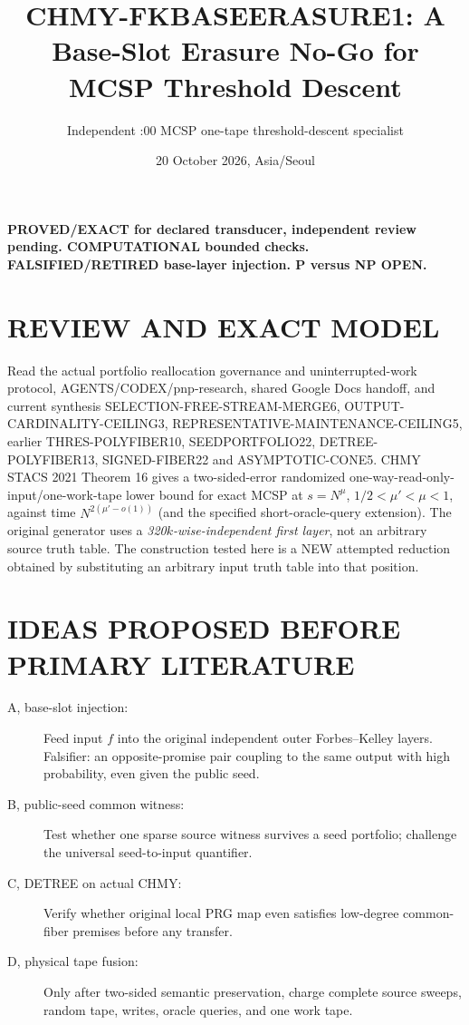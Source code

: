 \documentclass[11pt]{article}
\title{CHMY-FKBASEERASURE1: A Base-Slot Erasure No-Go for MCSP Threshold Descent}
\author{Independent :00 MCSP one-tape threshold-descent specialist}
\date{20 October 2026, Asia/Seoul}
\begin{document}
\maketitle
\noindent\textbf{PROVED/EXACT for declared transducer, independent review pending. COMPUTATIONAL bounded checks. FALSIFIED/RETIRED base-layer injection. P versus NP OPEN.}

\section*{REVIEW AND EXACT MODEL}
Read the actual portfolio reallocation governance and uninterrupted-work protocol, AGENTS/CODEX/pnp-research, shared Google Docs handoff, and current synthesis SELECTION-FREE-STREAM-MERGE6, OUTPUT-CARDINALITY-CEILING3, REPRESENTATIVE-MAINTENANCE-CEILING5, earlier THRES-POLYFIBER10, SEEDPORTFOLIO22, DETREE-POLYFIBER13, SIGNED-FIBER22 and ASYMPTOTIC-CONE5. CHMY STACS 2021 Theorem 16 gives a two-sided-error randomized one-way-read-only-input/one-work-tape lower bound for exact MCSP at $s=N^\mu$, $1/2<\mu'<\mu<1$, against time $N^{2(\mu'-o(1))}$ (and the specified short-oracle-query extension). The original generator uses a \emph{320$k$-wise-independent first layer}, not an arbitrary source truth table. The construction tested here is a NEW attempted reduction obtained by substituting an arbitrary input truth table into that position.

\section*{IDEAS PROPOSED BEFORE PRIMARY LITERATURE}
\begin{description}
\item[A, base-slot injection:] Feed input $f$ into the original independent outer Forbes--Kelley layers. Falsifier: an opposite-promise pair coupling to the same output with high probability, even given the public seed.
\item[B, public-seed common witness:] Test whether one sparse source witness survives a seed portfolio; challenge the universal seed-to-input quantifier.
\item[C, DETREE on actual CHMY:] Verify whether original local PRG map even satisfies low-degree common-fiber premises before any transfer.
\item[D, physical tape fusion:] Only after two-sided semantic preservation, charge complete source sweeps, random tape, writes, oracle queries, and one work tape.
\end{description}
\end{document}
